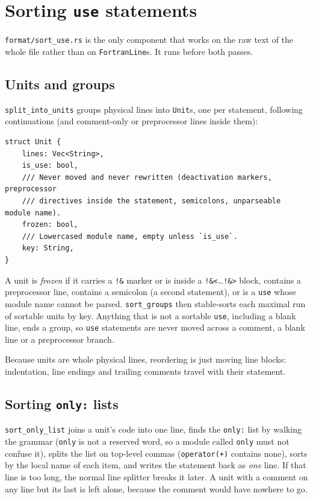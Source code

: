 \documentclass[11pt,a4paper,openany]{book}
\newcommand{\code}[1]{\texttt{\small #1}}
\newcommand{\file}[1]{\texttt{\small\color{accent}#1}}
\begin{document}
\section{Sorting \texttt{use} statements}

\file{format/sort\_use.rs} is the only component that works on the raw text
of the whole file rather than on \code{FortranLine}s. It runs before both passes.

\subsection{Units and groups}

\code{split\_into\_units} groups physical lines into \code{Unit}s, one per
statement, following continuations (and comment-only or preprocessor lines inside
them):

\begin{lstlisting}[style=rust]
struct Unit {
    lines: Vec<String>,
    is_use: bool,
    /// Never moved and never rewritten (deactivation markers, preprocessor
    /// directives inside the statement, semicolons, unparseable module name).
    frozen: bool,
    /// Lowercased module name, empty unless `is_use`.
    key: String,
}
\end{lstlisting}

A unit is \emph{frozen} if it carries a \code{!\&} marker or is inside a
\code{!\&<}\ldots\code{!\&>} block, contains a preprocessor line, contains a
semicolon (a second statement), or is a \code{use} whose module name cannot be
parsed. \code{sort\_groups} then stable-sorts each maximal run of sortable units
by key. Anything that is not a sortable \code{use}, including a blank line,
ends a group, so \code{use} statements are never moved across a comment, a
blank line or a preprocessor branch.

Because units are whole physical lines, reordering is just moving line blocks:
indentation, line endings and trailing comments travel with their
statement.

\subsection{Sorting \texttt{only:} lists}

\code{sort\_only\_list} joins a unit's code into one line, finds the
\code{only:} list by walking the grammar (\code{only} is not a reserved word,
so a module called \code{only} must not confuse it), splits the list on
top-level commas (\code{operator(+)} contains none), sorts by the local name of
each item, and writes the statement back as \emph{one} line. If that line is
too long, the normal line splitter breaks it later. A unit with a comment on any
line but its last is left alone, because the comment would have nowhere to go.
\end{document}
